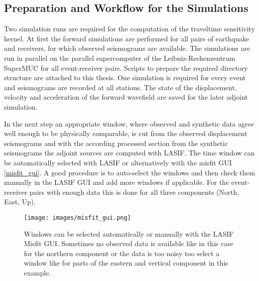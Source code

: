 \subsection{Preparation and Workflow for the Simulations}



Two simulation runs are required for the computation of the traveltime sensitivity kernel.
%
At first the forward simulations are performed for all pairs of earthquake and receivers, for which observed seismograms are available.
The simulations are run in parallel on the parallel supercomputer of the Leibniz-Rechenzentrum SuperMUC for all event-receiver pairs. 
Scripts to prepare the required directory structure are attached to this thesis. %
One simulation is required for every event and seismograms are recorded at all stations. 
The state of the displacement, velocity and acceleration of the forward wavefield are saved for the later adjoint simulation.

In the next step an appropriate window, where observed and synthetic data agree well enough to be physically comparable,
is cut from the observed displacement seismograms and with the according processed section from the synthetic seismograms 
the adjoint sources are computed with LASIF.
The time window can be automatically selected with LASIF or alternatively with the misfit GUI \autoref{misfit_gui}.
%
A good procedure is to auto-select the windows and then check them manually in the LASIF GUI and 
add more windows if applicable.
For the event-receiver pairs with enough data this is done for all three components (North, East, Up).

\begin{figure}[h]
\begin{center}
\texttt{[image: images/misfit\_gui.png]}
\caption[The LASIF Misfit GUI.]{Windows can be selected automatically or manually with the LASIF Misfit GUI.
Sometimes no observed data is available like in this case for the northern component
or the data is too noisy too select a window like for parts of the eastern and vertical component in this example.}
\label{misfit_gui}
\end{center}
\end{figure}

